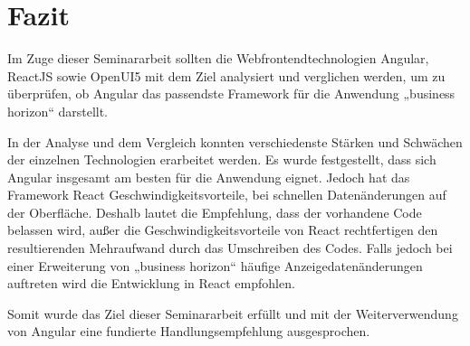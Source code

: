 

\chapter{Fazit}

Im Zuge dieser Seminararbeit sollten die Webfrontendtechnologien Angular, ReactJS sowie OpenUI5 mit dem Ziel analysiert und verglichen werden, um zu überprüfen, ob Angular das passendste Framework für die Anwendung „business horizon“ darstellt. 

In der Analyse und dem Vergleich konnten verschiedenste Stärken und Schwächen der einzelnen Technologien erarbeitet werden. Es wurde festgestellt, dass sich Angular insgesamt am besten für die Anwendung eignet. Jedoch hat das Framework React Geschwindigkeitsvorteile, bei schnellen Datenänderungen auf der Oberfläche. Deshalb lautet die Empfehlung, dass der vorhandene Code belassen wird, außer die Geschwindigkeitsvorteile von React rechtfertigen den resultierenden Mehraufwand durch das Umschreiben des Codes. Falls jedoch bei einer Erweiterung von „business horizon“ häufige Anzeigedatenänderungen auftreten wird die Entwicklung in React empfohlen.

Somit wurde das Ziel dieser Seminararbeit erfüllt und mit der Weiterverwendung von Angular eine fundierte Handlungsempfehlung ausgesprochen.
